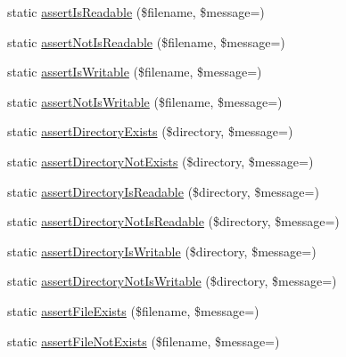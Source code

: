 \begin{DoxyCompactItemize}
static \mbox{\hyperlink{class_p_h_p_unit___framework___assert_a7c79b26f9457458e0b000153ad9b3ddc}{assert\+Is\+Readable}} (\$filename, \$message=\textquotesingle{}\textquotesingle{})
\item 
static \mbox{\hyperlink{class_p_h_p_unit___framework___assert_ab77c784f502bfd5361cf747d54d615c7}{assert\+Not\+Is\+Readable}} (\$filename, \$message=\textquotesingle{}\textquotesingle{})
\item 
static \mbox{\hyperlink{class_p_h_p_unit___framework___assert_aef647d06fbcc6fbc2f2eaff7cde78b2c}{assert\+Is\+Writable}} (\$filename, \$message=\textquotesingle{}\textquotesingle{})
\item 
static \mbox{\hyperlink{class_p_h_p_unit___framework___assert_afad748cedad7be7638565cd6675f9b73}{assert\+Not\+Is\+Writable}} (\$filename, \$message=\textquotesingle{}\textquotesingle{})
\item 
static \mbox{\hyperlink{class_p_h_p_unit___framework___assert_aa4674f845ba5607c5ac9c5fdd8c4b658}{assert\+Directory\+Exists}} (\$directory, \$message=\textquotesingle{}\textquotesingle{})
\item 
static \mbox{\hyperlink{class_p_h_p_unit___framework___assert_aba49f635180d273e3fd5ab66154ba31b}{assert\+Directory\+Not\+Exists}} (\$directory, \$message=\textquotesingle{}\textquotesingle{})
\item 
static \mbox{\hyperlink{class_p_h_p_unit___framework___assert_adb53274ed63064552fbda8e04dc4c26f}{assert\+Directory\+Is\+Readable}} (\$directory, \$message=\textquotesingle{}\textquotesingle{})
\item 
static \mbox{\hyperlink{class_p_h_p_unit___framework___assert_abd7611bc5114206866212bb0aec48b47}{assert\+Directory\+Not\+Is\+Readable}} (\$directory, \$message=\textquotesingle{}\textquotesingle{})
\item 
static \mbox{\hyperlink{class_p_h_p_unit___framework___assert_a60b39060225511304afdf12edc8e2054}{assert\+Directory\+Is\+Writable}} (\$directory, \$message=\textquotesingle{}\textquotesingle{})
\item 
static \mbox{\hyperlink{class_p_h_p_unit___framework___assert_aaabfba18a35f83ea09b27877506d11be}{assert\+Directory\+Not\+Is\+Writable}} (\$directory, \$message=\textquotesingle{}\textquotesingle{})
\item 
static \mbox{\hyperlink{class_p_h_p_unit___framework___assert_af80ecadc2f35e3fd9ba3729e5f8067ef}{assert\+File\+Exists}} (\$filename, \$message=\textquotesingle{}\textquotesingle{})
\item 
static \mbox{\hyperlink{class_p_h_p_unit___framework___assert_a755d5540157de2341b903a3af7991f94}{assert\+File\+Not\+Exists}} (\$filename, \$message=\textquotesingle{}\textquotesingle{})

\end{DoxyCompactItemize}
